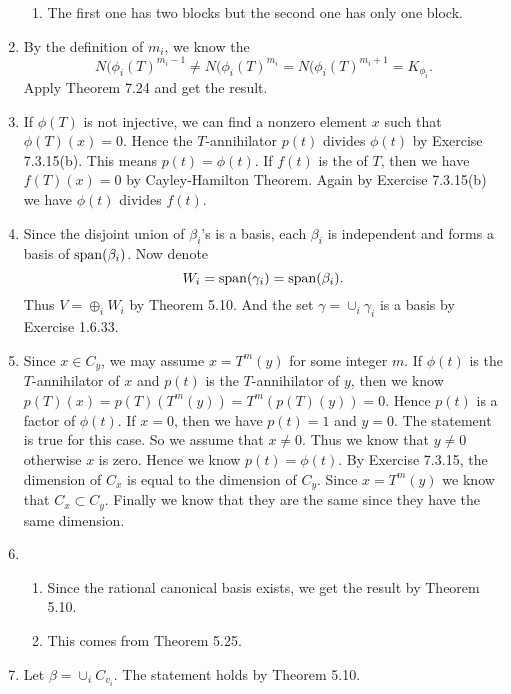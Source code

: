 \begin{enumerate}
\begin{enumerate}
\item The first one has two blocks but the second one has only one block.
\end{enumerate}
\item By the definition of $m_i$, we know the 
\[N(\phi_i(T)^{m_i-1}\neq N(\phi_i(T)^{m_i}=N(\phi_i(T)^{m_i+1}=K_{\phi_i}.\]
Apply Theorem 7.24 and get the result.
\item If $\phi(T)$ is not injective, we can find a nonzero element $x$ such that $\phi(T)(x)=0$. Hence the $T$-annihilator $p(t)$ divides $\phi(t)$ by Exercise 7.3.15(b). This means $p(t)=\phi(t)$. If $f(t)$ is the \charpoly{} of $T$, then we have $f(T)(x)=0$ by Cayley-Hamilton Theorem. Again by Exercise 7.3.15(b) we have $\phi(t)$ divides $f(t)$.
\item Since the disjoint union of $\beta_i$'s is a basis, each $\beta_i$ is independent and forms a basis of $\sp(\beta_i)$. Now denote 
\[W_i=\sp(\gamma_i)=\sp(\beta_i).\]
Thus $V=\oplus_iW_i$ by Theorem 5.10. And the set $\gamma=\cup_i\gamma_i$ is a basis by Exercise 1.6.33.
\item Since $x\in C_y$, we may assume $x=T^m(y)$ for some integer $m$. If $\phi(t)$ is the $T$-annihilator of $x$ and $p(t)$ is the $T$-annihilator of $y$, then we know $p(T)(x)=p(T)(T^m(y))=T^m(p(T)(y))=0$. Hence $p(t)$ is a factor of $\phi(t)$. If $x=0$, then we have $p(t)=1$ and $y=0$. The statement is true for this case. So we assume that $x\neq 0$. Thus we know that $y\neq 0$ otherwise $x$ is zero. Hence we know $p(t)=\phi(t)$. By Exercise 7.3.15, the dimension of $C_x$ is equal to the dimension of $C_y$. Since $x=T^m(y)$ we know that $C_x\subset C_y$. Finally we know that they are the same since they have the same dimension.
\item \begin{enumerate}
\item Since the rational canonical basis exists, we get the result by Theorem 5.10.
\item This comes from Theorem 5.25.
\end{enumerate}
\item Let $\beta=\cup_iC_{v_i}$. The statement holds by Theorem 5.10.
\end{enumerate}